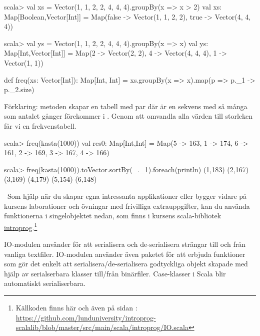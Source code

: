 \begin{REPL}
scala> val xs = Vector(1, 1, 2, 2, 4, 4, 4).groupBy(x => x > 2)
val xs: Map[Boolean,Vector[Int]] =
  Map(false -> Vector(1, 1, 2, 2), true -> Vector(4, 4, 4))

scala> val ys = Vector(1, 1, 2, 2, 4, 4, 4).groupBy(x => x)
val ys: Map[Int,Vector[Int]] =
  Map(2 -> Vector(2, 2), 4 -> Vector(4, 4, 4), 1 -> Vector(1, 1))
\end{REPL}


\SubtaskSolved

\begin{Code}
def freq(xs: Vector[Int]): Map[Int, Int] =
  xs.groupBy(x => x).map(p => p._1 -> p._2.size)
\end{Code}
Förklaring: metoden  skapar en tabell med par  där  är en sekvens med så många  som antalet gånger  förekommer i . Genom att omvandla alla värden  till storleken  får vi en frekvenstabell.

\begin{REPL}
scala> freq(kasta(1000))
val res0: Map[Int,Int] = 
  Map(5 -> 163, 1 -> 174, 6 -> 161, 2 -> 169, 3 -> 167, 4 -> 166)

scala> freq(kasta(1000)).toVector.sortBy(_._1).foreach(println)
(1,183)
(2,167)
(3,169)
(4,179)
(5,154)
(6,148)
\end{REPL}

\QUESTEND






\QUESTBEGIN

\Task \what~Som hjälp när du skapar egna intressanta applikationer eller bygger vidare på kursens laborationer och övningar med frivilliga extrauppgifter, kan du använda funktionerna i singelobjektet  nedan, som finns i kursens scala-bibliotek \href{http://cs.lth.se/pgk/api}{introprog}.\footnote{Källkoden finns här och även på sidan \pageref{disk-access-code}:\\ \href{https://github.com/lunduniversity/introprog/blob/master/compendium/workspace/introprog/src/main/scala/introprog/IO.scala}{https://github.com/lunduniversity/introprog-scalalib/blob/master/src/main/scala/introprog/IO.scala}}

IO-modulen använder  för att serialisera och de-serialisera strängar till och från vanliga textfiler. IO-modulen använder även paketet  för att erbjuda funktioner som gör det enkelt att serialisera/de-serialisera godtyckliga objekt skapade med hjälp av serialserbara klasser till/från binärfiler. Case-klasser i Scala blir automatiskt serialiserbara.

